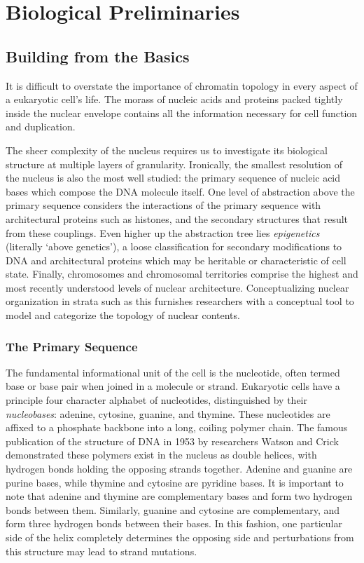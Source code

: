
\chapter{Biological Preliminaries}

\section{Building from the Basics}

It is difficult to overstate the importance of chromatin topology in
every aspect of a eukaryotic cell's life.  The morass of nucleic acids and
proteins packed tightly inside the nuclear envelope contains all the
information necessary for cell function and duplication.

The sheer complexity of the nucleus requires us to investigate its biological
structure at multiple layers of granularity.  Ironically, the smallest resolution
of the nucleus is also the most well studied: the primary sequence of nucleic
acid bases which compose the DNA molecule itself.  One level of abstraction
above the primary sequence considers the interactions of the primary sequence
with architectural proteins such as histones, and the secondary structures that
result from these couplings.  Even higher up the abstraction tree lies
\textit{epigenetics} (literally `above genetics'\cite{dictepi2014}), a loose
classification for secondary modifications to DNA and architectural proteins
which may be heritable or characteristic of cell state.  Finally, chromosomes
and chromosomal territories comprise the highest and most recently understood
levels of nuclear architecture.  Conceptualizing nuclear organization in
strata such as this furnishes researchers with a conceptual tool to model
and categorize the topology of nuclear contents.

\subsection{The Primary Sequence}

The fundamental informational unit of the cell is the nucleotide, often
termed base or base pair when joined in a molecule or strand.  Eukaryotic
cells have a principle four character alphabet of nucleotides, distinguished
by their \textit{nucleobases}: adenine, cytosine, guanine, and thymine.  These
nucleotides are affixed to a phosphate backbone into a long, coiling polymer
chain.  The famous publication of the structure of DNA in 1953 by researchers
Watson and Crick demonstrated these polymers exist in the nucleus as double
helices\cite{watson1953}, with hydrogen bonds holding the opposing strands
together.  Adenine and guanine are purine bases, while thymine and cytosine are
pyridine bases.  It is important to note that adenine and thymine are
complementary bases and form two hydrogen bonds between them.  Similarly,
guanine and cytosine are complementary, and form three hydrogen bonds between
their bases.  In this fashion, one particular side of the helix completely
determines the opposing side and perturbations from this structure may lead
to strand mutations\cite{cox2008}.

